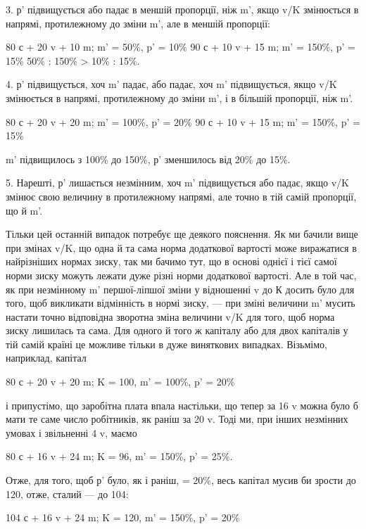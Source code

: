 3. р' підвищується або падає в меншій пропорції, ніж m',
якщо v/K змінюється в напрямі, протилежному до зміни m', але
в меншій пропорції:

80 с + 20 v + 10 m; m' = 50\%, p' = 10\%
90 с + 10 v + 15 m; m' = 150\%, p' = 15\%
50\% : 150\% > 10\% : 15\%.

4. р' підвищується, хоч m' падає, або падає, хоч m' підвищується,
якщо v/K змінюється в напрямі, протилежному до зміни
m', і в більшій пропорції, ніж m'.

80 с + 20 v + 20 m; m' = 100\%, p' = 20\%
90 с + 10 v + 15 m; m' = 150\%, p' = 15\%

m' підвищилось з 100\% до 150\%, р' зменшилось від 20\% до 15\%.

5. Нарешті, р' лишається незмінним, хоч m' підвищується або
падає, якщо v/K змінює свою величину в протилежному напрямі,
але точно в тій самій пропорції, що й m'.

Тільки цей останній випадок потребує ще деякого пояснення.
Як ми бачили вище при змінах v/K, що одна й та сама норма
додаткової вартості може виражатися в найрізніших нормах
зиску, так ми бачимо тут, що в основі однієї і тієї самої норми
зиску можуть лежати дуже різні норми додаткової вартості.
Але в той час, як при незмінному m' першої-ліпшої зміни у відношенні
v до К досить було для того, щоб викликати відмінність
в нормі зиску, — при зміні величини m' мусить настати точно
відповідна зворотна зміна величини v/K для того, щоб норма
зиску лишилась та сама. Для одного й того ж капіталу або для
двох капіталів у тій самій країні це можливе тільки в дуже
виняткових випадках. Візьмімо, наприклад, капітал

80 с + 20 v + 20 m; K = 100, m' = 100\%, p' = 20\%

і припустімо, що заробітна плата впала настільки, що тепер за
16 v можна було б мати те саме число робітників, як раніш за
20 v. Тоді ми, при інших незмінних умовах і звільненні 4 v,
маємо

80 с + 16 v + 24 m; K = 96, m' = 150\%, p' = 25\%.

Отже, для того, щоб р' було, як і раніш, = 20\%, весь капітал
мусив би зрости до 120, отже, сталий — до 104:

104 с + 16 v + 24 m; K = 120, m' = 150\%, p' = 20\%
